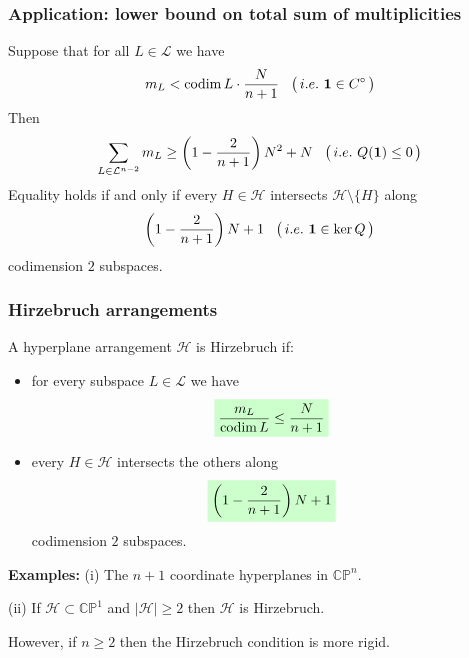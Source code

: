 \documentclass{beamer}
\newcommand{\CP}{\mathbb{CP}}
\newcommand{\mH}{\mathcal{H}}
\newcommand{\mL}{\mathcal{L}}
\DeclareMathOperator{\codim}{codim}
\newcommand{\mathcolorbox}[2]{\colorbox{#1}{$\displaystyle #2$}}
\begin{document}
\begin{frame}
	\frametitle{Application: lower bound on total sum of multiplicities}
	\begin{theorem}[dB-Panov, 2024]\label{thm:hir}
		Suppose that for all \(L \in \mL\) we have
		\begin{equation*}
		m_L < \codim L \cdot \frac{N}{n+1} \hspace{3mm} \big(\,i.e.\,\, \mathbf{1} \in C^{\circ} \,\big)
		\end{equation*}
		Then
		\begin{equation*}
		\sum_{L \in \mL^{n-2}} m_L \geq \left( 1 - \frac{2}{n+1} \right) N^2 + N \hspace{3mm} \big(\,i.e.\,\, Q(\mathbf{1}) \leq 0 \,\big)
		\end{equation*}
		Equality holds if and only if every \(H \in \mH\) intersects \(\mH \setminus \{H\}\) along
		\begin{equation*}
		\left( 1 - \frac{2}{n+1} \right) N + 1 \hspace{3mm} \big(\,i.e.\,\, \mathbf{1} \in \ker Q \,\big)	
		\end{equation*}
		codimension \(2\) subspaces.
	\end{theorem}
\end{frame}


\begin{frame}
	\frametitle{Hirzebruch arrangements}
	A hyperplane arrangement \(\mH\) is Hirzebruch if:
	\begin{itemize}
		\pause
		\item for every subspace \(L \in \mL\) we have
		\begin{equation*}
		\mathcolorbox{green!20}{
		\frac{m_L}{\codim L} \leq \frac{N}{n+1}
		} 
		\end{equation*}
		
		\pause
		\item every \(H \in \mH\) intersects the others along
		\begin{equation*}
		\mathcolorbox{green!20}{
		\left( 1 - \frac{2}{n+1} \right) N + 1
		} 
		\end{equation*}
		codimension \(2\) subspaces.
	\end{itemize}
\pause
\textbf{Examples:} (i) The \(n+1\) coordinate hyperplanes in \(\CP^n\).

(ii) If \(\mH \subset \CP^1\) and \(|\mH| \geq 2\) then \(\mH\) is Hirzebruch. 

However, if \(n\geq 2\) then the Hirzebruch condition is more rigid.

\end{frame}
\end{document}

